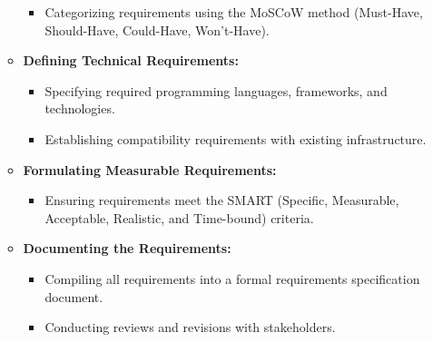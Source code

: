 \documentclass{article}
\begin{document}
\begin{itemize}[leftmargin=*, label={}]
\begin{itemize}
\begin{itemize}
            \item Categorizing requirements using the MoSCoW method (Must-Have, Should-Have, Could-Have, Won't-Have).
        \end{itemize}
        \item \textbf{Defining Technical Requirements:}
        \begin{itemize}
            \item Specifying required programming languages, frameworks, and technologies.
            \item Establishing compatibility requirements with existing infrastructure.
        \end{itemize}
        \item \textbf{Formulating Measurable Requirements:}
        \begin{itemize}
            \item Ensuring requirements meet the SMART (Specific, Measurable, Acceptable, Realistic, and Time-bound) criteria.
        \end{itemize}
        \item \textbf{Documenting the Requirements:}
        \begin{itemize}
            \item Compiling all requirements into a formal requirements specification document.
            \item Conducting reviews and revisions with stakeholders.
        \end{itemize}
    \end{itemize}


\end{itemize}
\end{document}
